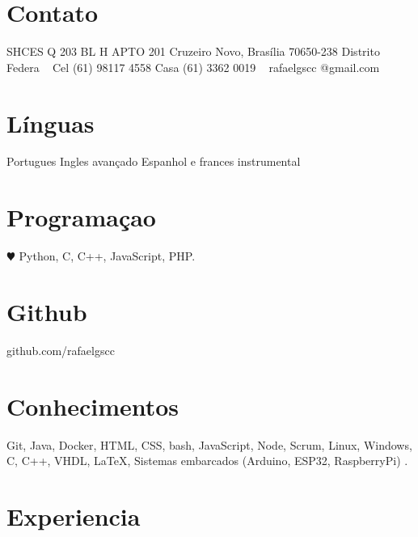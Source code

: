 \documentclass[]{cv-style}          %
\begin{document}
\lastupdated


\begin{aside}
%
\section{Contato}
SHCES Q 203 BL H APTO 201
Cruzeiro Novo, Brasília 70650-238
Distrito Federa
~
Cel (61) 98117 4558
Casa (61) 3362 0019
~
rafaelgscc
@gmail.com
%
\section{Línguas}
Portugues
Ingles avançado
Espanhol e frances instrumental
%
\section{Programaçao}
{\color{red} $\varheartsuit$} Python, C,
C++, JavaScript,
PHP.
%
\section{Github}
github.com/rafaelgscc
%

\end{aside}


\section{Conhecimentos}
  \vspace{-0.4cm}
Git, Java, Docker, HTML, CSS, bash, JavaScript, Node,  Scrum, Linux, Windows, C, C++, VHDL, \LaTeX , Sistemas embarcados (Arduino, ESP32, RaspberryPi) .


\section{Experiencia}
\end{document}

